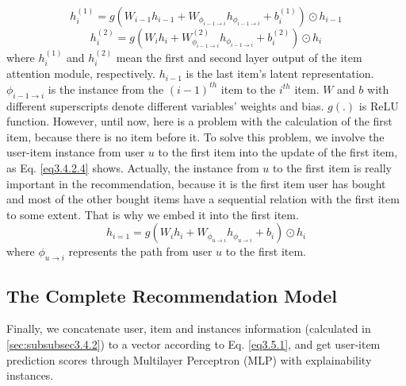 \begin{equation}
	\label{eq3.4.2.2}
	h_i^{(1)}=g(W_{i-1} h_{i-1} + W_{\phi _{i-1\rightarrow i}} h_{\phi _{i-1\rightarrow i}}+b_i^{(1)}) \odot h_{i-1}
\end{equation}
\begin{equation}
	\label{eq3.4.2.3}
	h_i^{(2)}=g(W_i h_i+W_{\phi _{i-1\rightarrow i}}^{(2)} h_{\phi _{i-1\rightarrow i}}+b_i^{(2)}) \odot h_i
\end{equation}
where $h_i^{(1)}$ and $h_i^{(2)}$ mean the first and second layer output of the item attention module, respectively. $h_{i-1}$ is the last item's latent representation. $\phi _{i-1\rightarrow i}$ is the instance from the $(i-1)^{th}$ item to the $i^{th}$ item. $W$ and $b$ with different superscripts denote different variables' weights and bias. $g(.)$ is ReLU function. However, until now, here is a problem with the calculation of the first item, because there is no item before it. To solve this problem, we involve the user-item instance from user $u$ to the first item into the update of the first item, as Eq. \ref{eq3.4.2.4} shows. Actually, the instance from $u$ to the first item is really important in the recommendation, because it is the first item user has bought and most of the other bought items have a sequential relation with the first item to some extent. That is why we embed it into the first item. 
\begin{equation}
	\label{eq3.4.2.4}
	h_{i=1} = g(W_{i} h_{i}+W_{\phi_{u\rightarrow i}}h_{\phi_{u\rightarrow i}}+b_{i}) \odot h_{i}
\end{equation}
where $\phi _{u\rightarrow i}$ represents the path from user $u$ to the first item.

\subsection{The Complete Recommendation Model} 
\label{subsec3.5}

Finally, we concatenate user, item and instances information (calculated in \ref{sec:subsubsec3.4.2}) to a vector according to Eq. \ref{eq3.5.1}, and get user-item prediction scores through Multilayer Perceptron (MLP) with explainability instances.


